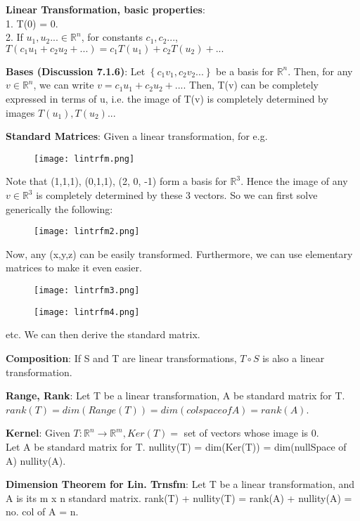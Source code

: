 \documentclass[a4paper,landscape]{article}
\newcommand{\rnname}[1]{\textbf{#1}}
\begin{document}
\begin{multicols*}{4}
\begin{flatitemize}
\item \rnname{Linear Transformation, basic properties}:\\
1. T(0) = 0. \\
2. If $u_{1}, u_{2} ... \in \mathbb{R}^n$, for constants $c_{1}, c_{2} ...$, $T(c_{1}u_{1} + c_{2}u_{2} + ...) = c_{1}T(u_{1}) + c_{2}T(u_{2}) + ...$
\item \rnname{Bases (Discussion 7.1.6)}: Let $\left\lbrace c_{1}v_{1}, c_{2}v_{2} ... \right\rbrace$ be a basis for $\mathbb{R}^n$.
Then, for any $v \in \mathbb{R}^n$, we can write $v = c_{1}u_{1} + c_{2}u_{2} + ...$. Then, T(v) can be completely expressed in terms of u, i.e. the image of T(v) is completely determined by images $T(u_{1}), T(u_{2}) ...$
\item \rnname{Standard Matrices}: Given a linear transformation, for e.g.
\vspace{-1.5em}
\begin{figure}[H]
  \texttt{[image: lintrfm.png]}
\end{figure}
\vspace{-1.5em}
Note that (1,1,1), (0,1,1), (2, 0, -1) form a basis for $\mathbb{R}^3$. Hence the image of any $v \in \mathbb{R}^3$ is completely determined by these 3 vectors. So we can first solve generically the following:
\vspace{-1.5em}
\begin{figure}[H]
  \texttt{[image: lintrfm2.png]}
\end{figure}
\vspace{-1.5em}
Now, any (x,y,z) can be easily transformed.
Furthermore, we can use elementary matrices to make it even easier. 
\vspace{-1.5em}
\begin{figure}[H]
  \texttt{[image: lintrfm3.png]}
\end{figure}
\vspace{-3em}
\begin{figure}[H]
  \texttt{[image: lintrfm4.png]}
\end{figure}
\vspace{-1.5em}
etc. We can then derive the standard matrix.
\item \rnname{Composition}: If S and T are linear transformations, $T\circ S$ is also a linear transformation. 
\item \rnname{Range, Rank}: Let T be a linear transformation, A be standard matrix for T. $rank(T) = dim(Range(T)) = dim(col space of A) = rank(A)$.
\item \rnname{Kernel}: Given $T: \mathbb{R}^n \rightarrow \mathbb{R}^m, Ker(T) = $ set of vectors whose image is 0. \\
Let A be standard matrix for T. nullity(T) = dim(Ker(T)) = dim(nullSpace of A) nullity(A).
\item \rnname{Dimension Theorem for Lin. Trnsfm}: Let T be a linear transformation, and A is its m x n standard matrix. rank(T) + nullity(T) = rank(A) + nullity(A) = no. col of A = n.

\end{flatitemize}
\end{multicols*}
\end{document}
